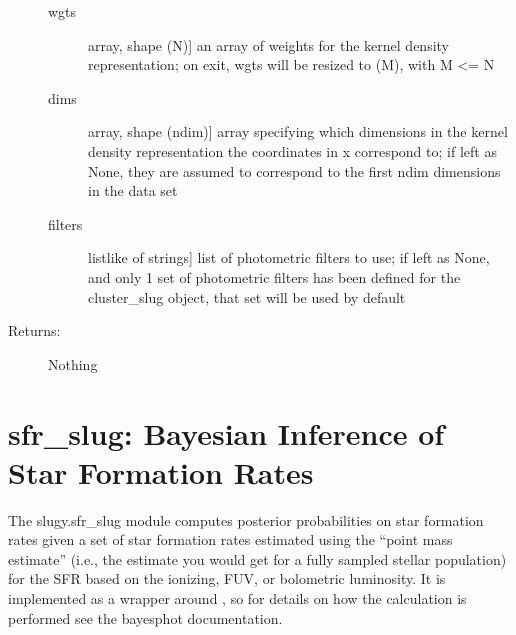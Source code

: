 \documentclass[letterpaper,10pt,english]{sphinxmanual}
\begin{document}
\begin{fulllineitems}
\begin{fulllineitems}
\begin{description}
\begin{description}
\item[{wgts}] \leavevmode{[}array, shape (N){]}
an array of weights for the kernel density
representation; on exit, wgts will be resized to (M),
with M \textless{}= N

\item[{dims}] \leavevmode{[}array, shape (ndim){]}
array specifying which dimensions in the kernel density
representation the coordinates in x correspond to; if
left as None, they are assumed to correspond to the
first ndim dimensions in the data set

\item[{filters}] \leavevmode{[}listlike of strings{]}
list of photometric filters to use; if left as None, and
only 1 set of photometric filters has been defined for
the cluster\_slug object, that set will be used by
default

\end{description}

\item[{Returns:}] \leavevmode
Nothing

\end{description}

\end{fulllineitems}


\end{fulllineitems}



\chapter{sfr\_slug: Bayesian Inference of Star Formation Rates}
\label{\detokenize{sfr_slug:sfr-slug-bayesian-inference-of-star-formation-rates}}\label{\detokenize{sfr_slug::doc}}\label{\detokenize{sfr_slug:sec-sfr-slug}}
The slugy.sfr\_slug module computes posterior probabilities on star formation rates given a set of star formation rates estimated using the “point mass estimate” (i.e., the estimate you would get for a fully sampled stellar population) for the SFR based on the ionizing, FUV, or bolometric luminosity. It is implemented as a wrapper around {\hyperref[\detokenize{bayesphot:sec-bayesphot}]{}}, so for details on how the calculation is performed see the bayesphot documentation.
\end{document}
